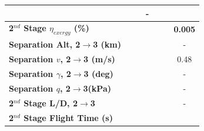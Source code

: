 \begin{table}[ht]
\begin{tabular}{l c c c c c c}
		& \firstsecondSeparationgammaTThreeOneHundredFiveNoReturn
		& \firstsecondSeparationgammaTThreeOneHundredTenNoReturn
		& -
		\\
		\hline 
		\textbf{2$^{nd}$ Stage $\eta_{exergy}$ (\%)}
		& \textbf{\secondExergyEffTThreeNinetyNoReturn}
		& \textbf{\secondExergyEffTThreeNinetyFiveNoReturn}
		& \textbf{\secondExergyEffTThreeStandardNoReturn}
		& \textbf{\secondExergyEffTThreeOneHundredFiveNoReturn}
		& \textbf{\secondExergyEffTThreeOneHundredTenNoReturn}
		& \textbf{0.005}
		\\
		\textbf{Separation Alt, 2$\rightarrow$3 (km)}
		& \secondthirdSeparationAltTThreeNinetyNoReturn
		& \secondthirdSeparationAltTThreeNinetyFiveNoReturn
		& \secondthirdSeparationAltTThreeStandardNoReturn
		& \secondthirdSeparationAltTThreeOneHundredFiveNoReturn
		& \secondthirdSeparationAltTThreeOneHundredTenNoReturn
		& -
		\\
		\textbf{Separation $v$, 2$\rightarrow$3 (m/s)}
		& \secondthirdSeparationvTThreeNinetyNoReturn
		& \secondthirdSeparationvTThreeNinetyFiveNoReturn
		& \secondthirdSeparationvTThreeStandardNoReturn
		& \secondthirdSeparationvTThreeOneHundredFiveNoReturn
		& \secondthirdSeparationvTThreeOneHundredTenNoReturn
		&0.48
		\\
		\textbf{Separation $\gamma$, 2$\rightarrow$3 (deg)}
		& \secondthirdSeparationgammaTThreeNinetyNoReturn
		& \secondthirdSeparationgammaTThreeNinetyFiveNoReturn
		& \secondthirdSeparationgammaTThreeStandardNoReturn
		& \secondthirdSeparationgammaTThreeOneHundredFiveNoReturn
		& \secondthirdSeparationgammaTThreeOneHundredTenNoReturn
		& -
		\\
		\textbf{Separation $q$, 2$\rightarrow$3(kPa)}
		& \secondthirdSeparationqTThreeNinetyNoReturn
		& \secondthirdSeparationqTThreeNinetyFiveNoReturn
		& \secondthirdSeparationqTThreeStandardNoReturn
		& \secondthirdSeparationqTThreeOneHundredFiveNoReturn
		& \secondthirdSeparationqTThreeOneHundredTenNoReturn
		& -
		\\
		\textbf{2$^{nd}$ Stage L/D, 2$\rightarrow$3}
		& \secondthirdSeparationLDTThreeNinetyNoReturn
		& \secondthirdSeparationLDTThreeNinetyFiveNoReturn
		& \secondthirdSeparationLDTThreeStandardNoReturn
		& \secondthirdSeparationLDTThreeOneHundredFiveNoReturn
		& \secondthirdSeparationLDTThreeOneHundredTenNoReturn
		& -
		\\
		\textbf{2$^{nd}$ Stage Flight Time (s)}
		& \secondFlightTimeTThreeNinetyNoReturn
		& \secondFlightTimeTThreeNinetyFiveNoReturn
		& \secondFlightTimeTThreeStandardNoReturn
		& \secondFlightTimeTThreeOneHundredFiveNoReturn

\end{tabular}
\end{table}
